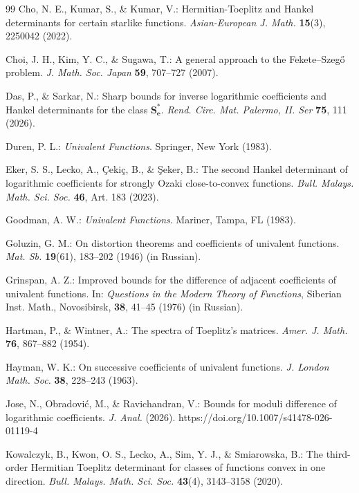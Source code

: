 \documentclass[11pt]{article}
\numberwithin{equation}{section}
\begin{document}
\begin{thebibliography}{99}
 Cho, N. E., Kumar, S., \& Kumar, V.: Hermitian-Toeplitz and Hankel determinants for certain starlike functions. \emph{Asian-European J. Math.} \textbf{15}(3), 2250042 (2022).

 Choi, J. H., Kim, Y. C., \& Sugawa, T.: A general approach to the Fekete--Szeg\H{o} problem. \emph{J. Math. Soc. Japan} \textbf{59}, 707--727 (2007).

 Das, P., \& Sarkar, N.: Sharp bounds for inverse logarithmic coefficients and Hankel determinants for the class $\mathbf{S}_\mathbf{e}^\ast$. \emph{Rend. Circ. Mat. Palermo, II. Ser} \textbf{75}, 111 (2026).

 Duren, P. L.: \emph{Univalent Functions}. Springer, New York (1983).

 Eker, S. S., Lecko, A., \c{C}eki\c{c}, B., \& \c{S}eker, B.: The second Hankel determinant of logarithmic coefficients for strongly Ozaki close-to-convex functions. \emph{Bull. Malays. Math. Sci. Soc.} \textbf{46}, Art. 183 (2023).

 Goodman, A. W.: \emph{Univalent Functions}. Mariner, Tampa, FL (1983).

 Goluzin, G. M.: On distortion theorems and coefficients of univalent functions. \emph{Mat. Sb.} \textbf{19}(61), 183--202 (1946) (in Russian).

 Grinspan, A. Z.: Improved bounds for the difference of adjacent coefficients of univalent functions. In: \emph{Questions in the Modern Theory of Functions}, Siberian Inst. Math., Novosibirsk, \textbf{38}, 41--45 (1976) (in Russian).

 Hartman, P., \& Wintner, A.: The spectra of Toeplitz's matrices. \emph{Amer. J. Math.} \textbf{76}, 867--882 (1954).

 Hayman, W. K.: On successive coefficients of univalent functions. \emph{J. London Math. Soc.} \textbf{38}, 228--243 (1963).

 Jose, N., Obradovi\'{c}, M., \& Ravichandran, V.: Bounds for moduli difference of logarithmic coefficients. \emph{J. Anal.} (2026). https://doi.org/10.1007/s41478-026-01119-4

 Kowalczyk, B., Kwon, O. S., Lecko, A., Sim, Y. J., \& Smiarowska, B.: The third-order Hermitian Toeplitz determinant for classes of functions convex in one direction. \emph{Bull. Malays. Math. Sci. Soc.} \textbf{43}(4), 3143--3158 (2020).


\end{thebibliography}
\end{document}
